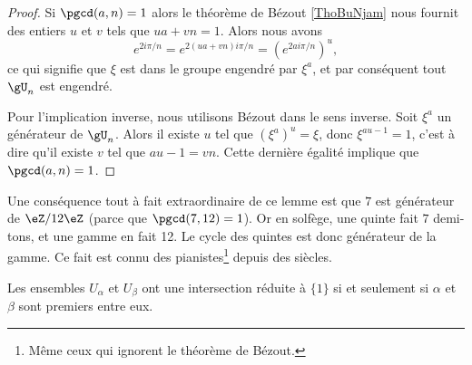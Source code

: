 \begin{proof}
    Si \( \pgcd(a,n)=1\) alors le théorème de Bézout \ref{ThoBuNjam} nous fournit des entiers \( u\) et \( v\) tels que \( ua+vn=1\). Alors nous avons
    \begin{equation}
        e^{2i\pi /n}= e^{2(ua+vn)i\pi/n}=( e^{2ai\pi/n})^u,
    \end{equation}
    ce qui signifie que \( \xi\) est dans le groupe engendré par \( \xi^a\), et par conséquent tout \( \gU_n\) est engendré.

    Pour l'implication inverse, nous utilisons Bézout dans le sens inverse. Soit \( \xi^a\) un générateur de \( \gU_n\). Alors il existe \( u\) tel que \( (\xi^a)^u=\xi\), donc \( \xi^{au-1}=1\), c'est à dire qu'il existe \( v\) tel que \( au-1=vn\). Cette dernière égalité implique que \( \pgcd(a,n)=1\).
\end{proof}

\begin{example}
Une conséquence tout à fait extraordinaire de ce lemme est que \( 7\) est générateur de \( \eZ/12\eZ\) (parce que \( \pgcd(7,12)=1\)). Or en solfège, une quinte fait \( 7\) demi-tons, et une gamme en fait 12. Le cycle des quintes est donc générateur de la gamme\cite{YDXsAM}. Ce fait est connu des pianistes\footnote{Même ceux qui ignorent le théorème de Bézout.} depuis des siècles.
\end{example}

\begin{proposition}      \label{PROPooIOQEooGMcCJm}
    Les ensembles \( U_{\alpha}\) et \( U_{\beta}\) ont une intersection réduite à \( \{ 1 \}\) si et seulement si \( \alpha\) et \( \beta\) sont premiers entre eux.
\end{proposition}

